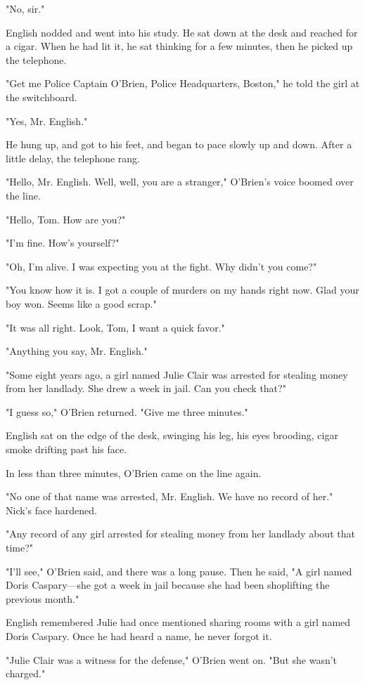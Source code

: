 \documentclass{novel}
\begin{document}
"No, sir."

English nodded and went into his study. He sat down at the desk and reached for a cigar. When he had lit it, he sat thinking for a few minutes, then he picked up the telephone.

"Get me Police Captain O'Brien, Police Headquarters, Boston," he told the girl at the switchboard.

"Yes, Mr. English."

He hung up, and got to his feet, and began to pace slowly up and down. After a little delay, the telephone rang.

"Hello, Mr. English. Well, well, you are a stranger," O'Brien's voice boomed over the line.

"Hello, Tom. How are you?"

"I'm fine. How's yourself?"

"Oh, I'm alive. I was expecting you at the fight. Why didn't you come?"

"You know how it is. I got a couple of murders on my hands right now. Glad your boy won. Seems like a good scrap."

"It was all right. Look, Tom, I want a quick favor."

"Anything you say, Mr. English."

"Some eight years ago, a girl named Julie Clair was arrested for stealing money from her landlady. She drew a week in jail. Can you check that?"

"I guess so," O'Brien returned. "Give me three minutes."

English sat on the edge of the desk, swinging his leg, his eyes brooding, cigar smoke drifting past his face.

In less than three minutes, O'Brien came on the line again.

"No one of that name was arrested, Mr. English. We have no record of her." \- Nick's face hardened.

"Any record of any girl arrested for stealing money from her landlady about that time?"

"I'll see," O'Brien said, and there was a long pause. Then he said, "A girl named Doris Caspary—she got a week in jail because she had been shoplifting the previous month."

English remembered Julie had once mentioned sharing rooms with a girl named Doris Caspary. Once he had heard a name, he never forgot it.

"Julie Clair was a witness for the defense," O'Brien went on. "But she wasn't charged."
\end{document}
